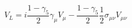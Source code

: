 \begin{equation} 
V_{L} = i \frac{1- \gamma_{5}}{2} \gamma_{\mu} V_{\mu} - 
 \frac{1- \gamma_{5}}{2} \frac{1}{2} \sigma_{\mu \nu} V_{\mu \nu} 
\end{equation} 
